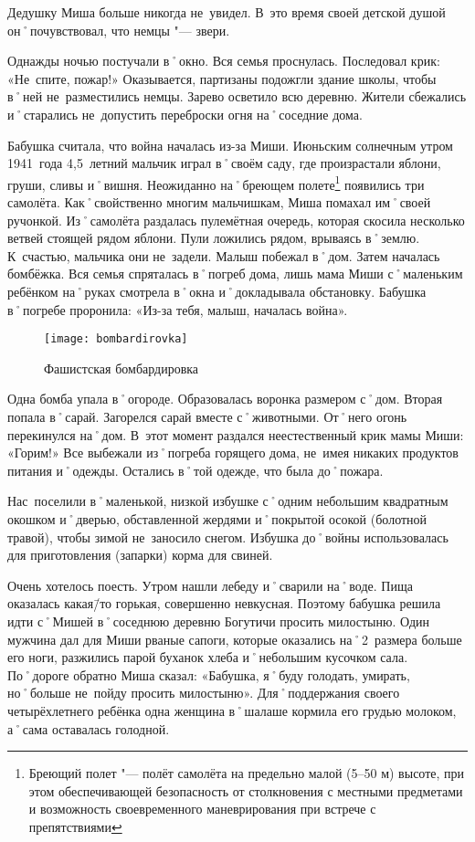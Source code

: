 Дедушку Миша больше никогда не~увидел. В~это время своей детской душой он˚почувствовал, что немцы "--- звери.

Однажды ночью постучали в˚окно. Вся семья проснулась. Последовал крик: «Не~спите, пожар!» Оказывается, партизаны подожгли здание школы, чтобы в˚ней не~разместились немцы. Зарево осветило всю деревню. Жители сбежались и˚старались не~допустить переброски огня на˚соседние дома.

Бабушка считала, что война началась из-за Миши. Июньским солнечным утром 1941~года 4,5~летний мальчик играл в˚своём саду, где произрастали яблони, груши, сливы и˚вишня. Неожиданно на˚бреющем полете\footnote{Бреющий полет "--- полёт самолёта на предельно малой (5–50 м) высоте, при этом обеспечивающей безопасность от столкновения с местными предметами и возможность своевременного маневрирования при встрече с препятствиями} появились три самолёта. Как˚свойственно многим мальчишкам, Миша помахал им˚своей ручонкой. Из˚самолёта раздалась пулемётная очередь, которая скосила несколько ветвей стоящей рядом яблони. Пули ложились рядом, врываясь в˚землю. К~счастью, мальчика они не~задели. Малыш побежал в˚дом. Затем началась бомбёжка. Вся семья спряталась в˚погреб дома, лишь мама Миши с˚маленьким ребёнком на˚руках смотрела в˚окна и˚докладывала обстановку. Бабушка в˚погребе проронила: «Из-за тебя, малыш, началась война».

\begin{wrapfigure}{O}{.4\textwidth}
\centering
\texttt{[image: bombardirovka]}
\caption{Фашистская бомбардировка}
\label{fig:bombardirovka}
\end{wrapfigure}

Одна бомба упала в˚огороде. Образовалась воронка размером с˚дом. Вторая попала в˚сарай. Загорелся сарай вместе с˚животными. От˚него огонь перекинулся на˚дом. В~этот момент раздался неестественный крик мамы Миши: «Горим!» Все выбежали из˚погреба горящего дома, не~имея никаких продуктов питания и˚одежды. Остались в˚той одежде, что была до˚пожара.

Нас~поселили в˚маленькой, низкой избушке с˚одним небольшим квадратным окошком и˚дверью, обставленной жердями и˚покрытой осокой (болотной травой), чтобы зимой не~заносило снегом. Избушка до˚войны использовалась для приготовления (запарки) корма для свиней.

Очень хотелось поесть. Утром нашли лебеду и˚сварили на˚воде. Пища оказалась какая\=/то горькая, совершенно невкусная. Поэтому бабушка решила идти с˚Мишей в˚соседнюю деревню Богутичи просить милостыню. Один мужчина дал для Миши рваные сапоги, которые оказались на˚2~размера больше его ноги, разжились парой буханок хлеба и˚небольшим кусочком сала. По˚дороге обратно Миша сказал: «Бабушка, я˚буду голодать, умирать, но˚больше не~пойду просить милостыню». Для˚поддержания своего четырёхлетнего ребёнка одна женщина в˚шалаше кормила его грудью молоком, а˚сама оставалась голодной.

